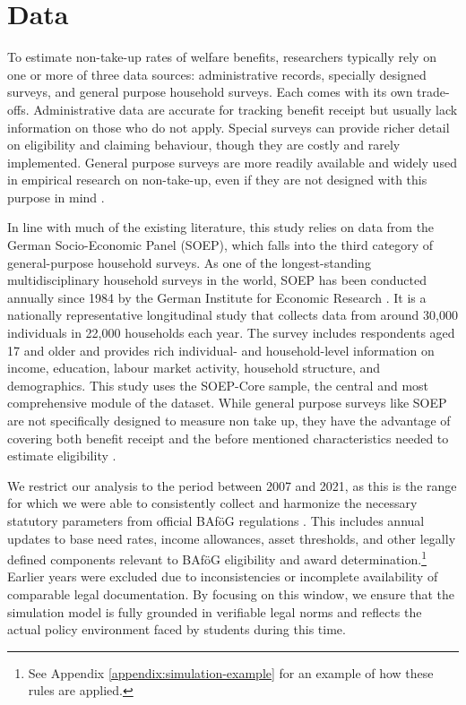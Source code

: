 %
%




\section{Data}
To estimate non-take-up rates of welfare benefits, researchers typically rely on one or more of three data sources: administrative records, specially designed surveys, and general purpose household surveys. 
Each comes with its own trade-offs. 
Administrative data are accurate for tracking benefit receipt but usually lack information on those who do not apply. 
Special surveys can provide richer detail on eligibility and claiming behaviour, though they are costly and rarely implemented. 
General purpose surveys are more readily available and widely used in empirical research on non-take-up, even if they are not designed with this purpose in mind \citep{mechelen_who_2017}.

In line with much of the existing literature, this study relies on data from the German Socio-Economic Panel (SOEP), which falls into the third category of general-purpose household surveys. 
As one of the longest-standing multidisciplinary household surveys in the world, SOEP has been conducted annually since 1984 by the German Institute for Economic Research \citep{soepcore_v39}. 
It is a nationally representative longitudinal study that collects data from around 30,000 individuals in 22,000 households each year. 
The survey includes respondents aged 17 and older and provides rich individual- and household-level information on income, education, labour market activity, household structure, and demographics. 
This study uses the SOEP-Core sample, the central and most comprehensive module of the dataset. While general purpose surveys like SOEP are not specifically designed to measure non take up, they have the advantage of covering both benefit receipt and the before mentioned characteristics needed to estimate eligibility \citep{mechelen_who_2017}.

We restrict our analysis to the period between 2007 and 2021, as this is the range for which we were able to consistently collect and harmonize the necessary statutory parameters from official BAföG regulations \citep{bafoeg_law}. This includes annual updates to base need rates, income allowances, asset thresholds, and other legally defined components relevant to BAföG eligibility and award determination.\footnote{
  See Appendix \ref{appendix:simulation-example} for an example of how these rules are applied.
}
Earlier years were excluded due to inconsistencies or incomplete availability of comparable legal documentation. 
By focusing on this window, we ensure that the simulation model is fully grounded in verifiable legal norms and reflects the actual policy environment faced by students during this time.

